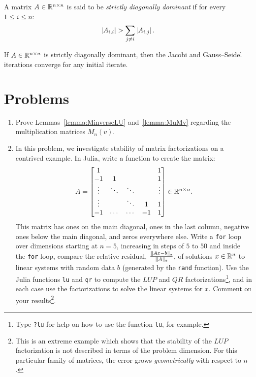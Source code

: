 \begin{definition}
A matrix $A\in\mathbb{R}^{n\times n}$ is said to be {\em strictly diagonally dominant} if for every $1\le i\le n$:
\[
\left|{A_{i,i}}\right| > \sum_{j\ne i} \left|{A_{i,j}}\right|.
\]
\end{definition}

\begin{theorem}\label{theorem:DiagonalDominance}
If $A\in\mathbb{R}^{n\times n}$ is strictly diagonally dominant, then the Jacobi and Gauss--Seidel iterations converge for any initial iterate.
\end{theorem}

\section{Problems}

\begin{enumerate}

\item Prove Lemmas~\ref{lemma:MinverseLU} and~\ref{lemma:MuMv} regarding the multiplication matrices $M_n(v)$.

\item In this problem, we investigate stability of matrix factorizations on a contrived example. In {\sc Julia}, write a function to create the matrix:
\[
A = \begin{bmatrix} 1 & & & & 1\\ -1 & 1 & & & 1\\ \vdots & \ddots & \ddots & & \vdots\\ \vdots & & \ddots & 1 & 1\\ -1 & \cdots & \cdots & -1 & 1\end{bmatrix} \in \mathbb{R}^{n\times n}.
\]
This matrix has ones on the main diagonal, ones in the last column, negative ones below the main diagonal, and zeros everywhere else. Write a {\tt for} loop over dimensions starting at $n=5$, increasing in steps of $5$ to $50$ and inside the {\tt for} loop, compare the relative residual, $\frac{\left\|{Ax - b}\right\|_2}{\left\|{A}\right\|_2}$, of solutions $x\in\mathbb{R}^n$ to linear systems with random data $b$ (generated by the {\tt rand} function). Use the {\sc Julia} functions {\tt lu} and {\tt qr} to compute the $LUP$ and $QR$ factorizations\footnote{Type {\tt ?lu} for help on how to use the function {\tt lu}, for example.}, and in each case use the factorizations to solve the linear systems for $x$. Comment on your results\footnote{This is an extreme example which shows that the stability of the $LUP$ factorization is not described in terms of the problem dimension. For this particular family of matrices, the error grows {\em geometrically} with respect to $n$.}.


\end{enumerate}
